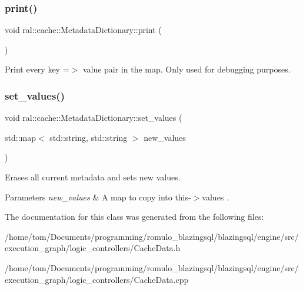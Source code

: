 \subsubsection{\texorpdfstring{print()}{print()}}
{\footnotesize\ttfamily void ral\+::cache\+::\+Metadata\+Dictionary\+::print (\begin{DoxyParamCaption}{ }\end{DoxyParamCaption})\hspace{0.3cm}{\ttfamily [inline]}}

Print every key =$>$ value pair in the map. Only used for debugging purposes. \mbox{\label{classral_1_1cache_1_1MetadataDictionary_a99d66a4b93ebb5f187da5c8968054a54}} 
\subsubsection{\texorpdfstring{set\+\_\+values()}{set\_values()}}
{\footnotesize\ttfamily void ral\+::cache\+::\+Metadata\+Dictionary\+::set\+\_\+values (\begin{DoxyParamCaption}\item[{std\+::map$<$ std\+::string, std\+::string $>$}]{new\+\_\+values }\end{DoxyParamCaption})\hspace{0.3cm}{\ttfamily [inline]}}

Erases all current metadata and sets new values. 
\begin{DoxyParams}{Parameters}
{\em new\+\_\+values} & A map to copy into this-\/$>$values . \\
\hline
\end{DoxyParams}


The documentation for this class was generated from the following files\+:\begin{DoxyCompactItemize}
\item 
/home/tom/\+Documents/programming/romulo\+\_\+blazingsql/blazingsql/engine/src/execution\+\_\+graph/logic\+\_\+controllers/Cache\+Data.\+h\item 
/home/tom/\+Documents/programming/romulo\+\_\+blazingsql/blazingsql/engine/src/execution\+\_\+graph/logic\+\_\+controllers/Cache\+Data.\+cpp\end{DoxyCompactItemize}
